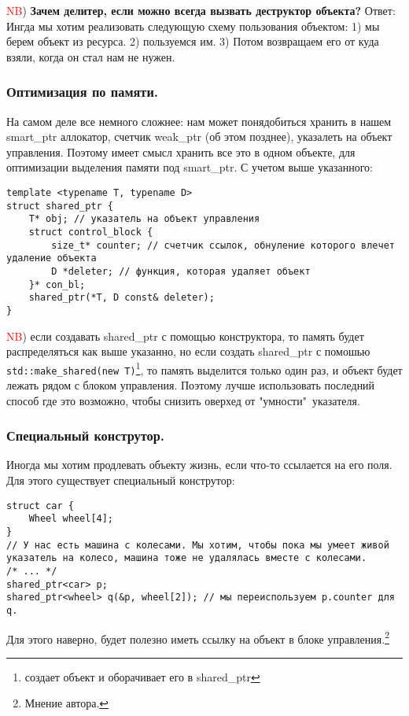 \documentclass[12pt]{article}
\begin{document}
\textcolor{red}{NB}) \textbf{Зачем делитер, если можно всегда вызвать деструктор объекта?} Ответ: Ингда мы хотим реализовать следующую схему пользования объектом: 1) мы берем объект из ресурса. 2) пользуемся им. 3) Потом возвращаем его от куда взяли, когда он стал нам не нужен.

\subsubsection{Оптимизация по памяти.}
На самом деле все немного сложнее: нам может понядобиться хранить в нашем smart\_ptr аллокатор, счетчик weak\_ptr (об этом позднее), указалеть на объект управления. Поэтому имеет смысл хранить все это в одном объекте, для оптимизации выделения памяти под smart\_ptr. С учетом выше указанного:

\begin{verbatim}
template <typename T, typename D>
struct shared_ptr {
    T* obj; // указатель на объект управления
    struct control_block {
        size_t* counter; // счетчик ссылок, обнуление которого влечет удаление объекта
        D *deleter; // функция, которая удаляет объект
    }* con_bl;
    shared_ptr(*T, D const& deleter);
}

\end{verbatim}


\textcolor{red}{NB}) если создавать shared\_ptr с помощью конструктора, то память будет распределяться как выше указанно, но если создать shared\_ptr с помошью \texttt{std::make_shared(new T)}\footnote{создает объект и оборачивает его в shared\_ptr}, то память выделится только один раз, и объект будет лежать рядом с блоком управления. Поэтому лучше использовать последний способ где это возможно, чтобы снизить оверхед от "умности"\ указателя.

\subsubsection{Специальный конструтор.}
Иногда мы хотим продлевать объекту жизнь, если что-то ссылается на его поля. Для этого существует специальный конструтор:

\begin{verbatim}
struct car {
    Wheel wheel[4];
}
// У нас есть машина с колесами. Мы хотим, чтобы пока мы умеет живой указатель на колесо, машина тоже не удалялась вместе с колесами.
/* ... */
shared_ptr<car> p;
shared_ptr<wheel> q(&p, wheel[2]); // мы переиспользуем p.counter для q.

\end{verbatim}
Для этого наверно, будет полезно иметь ссылку на объект в блоке управления.\footnote{Мнение автора.}
\end{document}
